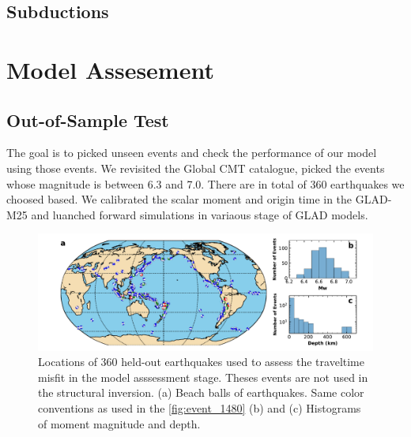 \documentclass[extra,mreferee]{gji}
\begin{document}

\subsection{Subductions}

\section{Model Assesement}

\subsection{Out-of-Sample Test}

The goal is to picked unseen events and check the performance of our model using those events. We revisited the Global CMT catalogue, picked the events whose magnitude is between 6.3 and 7.0. There are in total of 360 earthquakes we choosed based. We calibrated the scalar moment and origin time in the GLAD-M25 and luanched forward simulations in variaous stage of GLAD models.

\begin{figure}
\includegraphics[width=\textwidth]{figures/events_360.pdf}
  \caption{Locations of 360 held-out earthquakes used to assess the traveltime misfit in the model asssessment stage. Theses events are not used in the structural inversion. (a) Beach balls of earthquakes. Same color conventions as used in the \ref{fig:event_1480} (b) and (c) Histograms of moment magnitude and depth.}
\centering
\end{figure}
\end{document}
